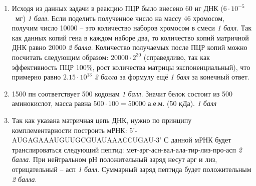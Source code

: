 \solutionSection

\begin{enumerate}
    \item Исходя из данных задачи в реакцию ПЦР было внесено 60 нг ДНК ($6 \cdot 10^{-5}$~мг) \textit{1 балл}. 
    Если поделить полученное число на массу 46 хромосом, получим число 10000 – это количество наборов 
    хромосом в смеси \textit{1 балл}. Так как данных копий гена в каждом наборе два, то количество копий матричной 
    ДНК равно 20000 \textit{2 балла}. Количество получаемых после ПЦР копий можно посчитать следующим образом: 
    $20000 \cdot 2^{30}$ (справедливо, так как эффективность ПЦР 100\%, рост количества матрицы экспоненциальный), 
    что примерно равно $2.15 \cdot 10^{13}$ \textit{2 балла} за формулу ещё \textit{1 балл} за конечный ответ.
    \item 1500 пн соответствует 500 кодонам \textit{1 балл}. Значит белок состоит из 500 
    аминокислот, масса равна $500 \cdot 100 = 50000$ а.е.м. (50 кДа). \textit{1 балл}
    \item Так как указана матричная цепь ДНК, нужно по принципу комплементарности построить мРНК: 5’-AUGAGAAAUGUUGCGUAUAAACCUGAU-3’
    С данной мРНК будет транслироваться следующий пептид: мет-арг-асн-вал-ала-тир-лиз-про-асп \textit{2 балла}. При нейтральном рН положительный заряд несут арг и лиз, отрицательный – асп \textit{1 балл}. Суммарный заряд пептида будет положительным \textit{2 балла}.
\end{enumerate}